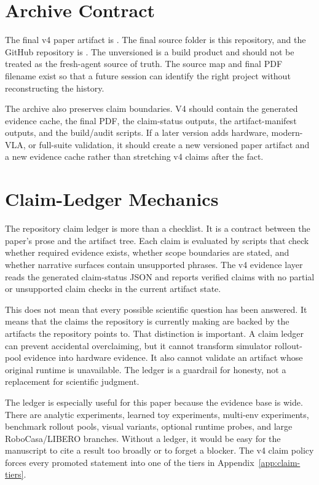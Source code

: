 \section{Archive Contract}
\label{app:archive-contract}

The final v4 paper artifact is . The final source
folder is this repository, and the GitHub repository is
. The unversioned
 is a build product and should not be treated as the
fresh-agent source of truth. The source map and final PDF filename exist so
that a future session can identify the right project without reconstructing
the history.

The archive also preserves claim boundaries. V4 should contain the generated
evidence cache, the final PDF, the claim-status outputs, the artifact-manifest
outputs, and the build/audit scripts. If a later version adds hardware,
modern-VLA, or full-suite validation, it should create a new versioned paper
artifact and a new evidence cache rather than stretching v4 claims after the
fact.

\section{Claim-Ledger Mechanics}
\label{app:claim-ledger-mechanics}

The repository claim ledger is more than a checklist. It is a contract between
the paper's prose and the artifact tree. Each claim is evaluated by scripts
that check whether required evidence exists, whether scope boundaries are
stated, and whether narrative surfaces contain unsupported phrases. The v4
evidence layer reads the generated claim-status JSON and reports
\VFourWAMClaimsVerified{} verified claims with no partial or unsupported claim
checks in the current artifact state.

This does not mean that every possible scientific question has been answered.
It means that the claims the repository is currently making are backed by the
artifacts the repository points to. That distinction is important. A claim
ledger can prevent accidental overclaiming, but it cannot transform simulator
rollout-pool evidence into hardware evidence. It also cannot validate an
artifact whose original runtime is unavailable. The ledger is a guardrail for
honesty, not a replacement for scientific judgment.

The ledger is especially useful for this paper because the evidence base is
wide. There are analytic experiments, learned toy experiments, multi-env
experiments, benchmark rollout pools, visual variants, optional runtime probes,
and large RoboCasa/LIBERO branches. Without a ledger, it would be easy for the
manuscript to cite a result too broadly or to forget a blocker. The v4 claim
policy forces every promoted statement into one of the tiers in
Appendix~\ref{app:claim-tiers}.

